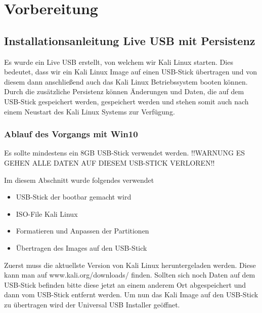\chapter{Vorbereitung}

\section{Installationsanleitung Live USB mit Persistenz}

Es wurde ein Live USB erstellt, von welchem wir Kali Linux starten. Dies bedeutet, dass wir ein Kali Linux Image auf einen USB-Stick übertragen und von diesem dann anschließend auch das Kali Linux Betriebssystem booten können. 
Durch die zusätzliche Persistenz können Änderungen und Daten, die auf dem USB-Stick gespeichert werden, gespeichert werden und stehen somit auch nach einem Neustart des Kali Linux Systems zur Verfügung.

\subsection{Ablauf des Vorgangs mit Win10}

Es sollte mindestens ein 8GB USB-Stick verwendet werden.
!!WARNUNG ES GEHEN ALLE DATEN AUF DIESEM USB-STICK VERLOREN!!

Im diesem Abschnitt wurde folgendes verwendet

\begin{itemize}
	\item {} USB-Stick der bootbar gemacht wird
	\item {} ISO-File Kali Linux
	\item {} Formatieren und Anpassen der Partitionen
	\item {} Übertragen des Images auf den USB-Stick
\end{itemize}

Zuerst muss die aktuellste Version von Kali Linux heruntergeladen werden. Diese kann man auf www.kali.org/downloads/ finden.
Sollten sich noch Daten auf dem USB-Stick befinden bitte diese jetzt an einem anderem Ort abgespeichert und dann vom USB-Stick entfernt werden. 
Um nun das Kali Image auf den USB-Stick zu übertragen wird der Universal USB Installer geöffnet.

